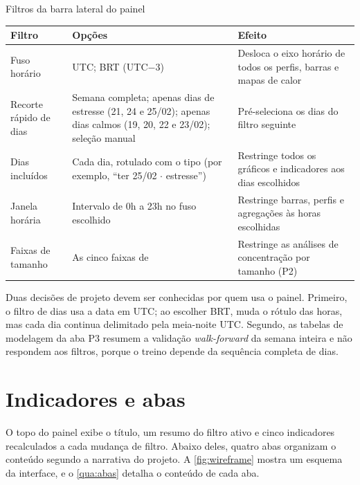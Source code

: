 \begin{quadro}[htbp]
\caption{\label{qua:filtros}Filtros da barra lateral do painel}
\begin{corpotabela}
\begin{tabularx}{\textwidth}{|L{3.4cm}|L{4.2cm}|Y|}
\hline
\textbf{Filtro} & \textbf{Opções} & \textbf{Efeito} \\ \hline
Fuso horário & UTC; BRT (UTC$-3$) & Desloca o eixo horário de todos os perfis, barras e mapas de calor \\ \hline
Recorte rápido de dias & Semana completa; apenas dias de estresse (21, 24 e 25/02); apenas dias calmos (19, 20, 22 e 23/02); seleção manual & Pré-seleciona os dias do filtro seguinte \\ \hline
Dias incluídos & Cada dia, rotulado com o tipo (por exemplo, ``ter 25/02 $\cdot$ estresse'') & Restringe todos os gráficos e indicadores aos dias escolhidos \\ \hline
Janela horária & Intervalo de 0h a 23h no fuso escolhido & Restringe barras, perfis e agregações às horas escolhidas \\ \hline
Faixas de tamanho & As cinco faixas de  & Restringe as análises de concentração por tamanho (P2) \\ \hline
\end{tabularx}
\end{corpotabela}
\fonteautores[Elaborado]
\end{quadro}

Duas decisões de projeto devem ser conhecidas por quem usa o painel. Primeiro, o
filtro de dias usa a data em UTC; ao escolher BRT, muda o rótulo das horas, mas
cada dia continua delimitado pela meia-noite UTC. Segundo, as tabelas de
modelagem da aba P3 resumem a validação \textit{walk-forward} da semana inteira e
não respondem aos filtros, porque o treino depende da sequência completa de dias.

\section{Indicadores e abas}\label{sec:abas}

O topo do painel exibe o título, um resumo do filtro ativo e cinco indicadores
recalculados a cada mudança de filtro. Abaixo deles, quatro abas organizam o
conteúdo segundo a narrativa do projeto. A \autoref{fig:wireframe} mostra um
esquema da interface, e o \autoref{qua:abas} detalha o conteúdo de cada aba.

